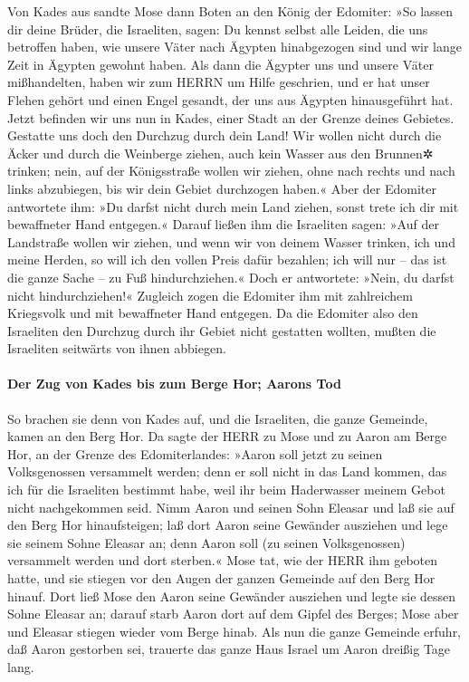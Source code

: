 Von Kades aus sandte Mose dann Boten an den König der
Edomiter: »So lassen dir deine Brüder, die Israeliten, sagen: Du kennst
selbst alle Leiden, die uns betroffen haben, wie unsere
Väter nach Ägypten hinabgezogen sind und wir lange Zeit in Ägypten
gewohnt haben. Als dann die Ägypter uns und unsere Väter mißhandelten,
haben wir zum HERRN um Hilfe geschrien, und er hat unser
Flehen gehört und einen Engel gesandt, der uns aus Ägypten hinausgeführt
hat. Jetzt befinden wir uns nun in Kades, einer Stadt an der Grenze
deines Gebietes. Gestatte uns doch den Durchzug durch
dein Land! Wir wollen nicht durch die Äcker und durch die Weinberge
ziehen, auch kein Wasser aus den Brunnen✲ trinken; nein, auf der
Königsstraße wollen wir ziehen, ohne nach rechts und nach links
abzubiegen, bis wir dein Gebiet durchzogen haben.« Aber
der Edomiter antwortete ihm: »Du darfst nicht durch mein Land ziehen,
sonst trete ich dir mit bewaffneter Hand entgegen.«
Darauf ließen ihm die Israeliten sagen: »Auf der
Landstraße wollen wir ziehen, und wenn wir von deinem Wasser trinken,
ich und meine Herden, so will ich den vollen Preis dafür bezahlen; ich
will nur -- das ist die ganze Sache -- zu Fuß hindurchziehen.«
Doch er antwortete: »Nein, du darfst nicht
hindurchziehen!« Zugleich zogen die Edomiter ihm mit zahlreichem
Kriegsvolk und mit bewaffneter Hand entgegen. Da die
Edomiter also den Israeliten den Durchzug durch ihr Gebiet nicht
gestatten wollten, mußten die Israeliten seitwärts von ihnen abbiegen.

\hypertarget{der-zug-von-kades-bis-zum-berge-hor-aarons-tod}{%
\paragraph{Der Zug von Kades bis zum Berge Hor; Aarons
Tod}\label{der-zug-von-kades-bis-zum-berge-hor-aarons-tod}}

So brachen sie denn von Kades auf, und die Israeliten,
die ganze Gemeinde, kamen an den Berg Hor. Da sagte der
HERR zu Mose und zu Aaron am Berge Hor, an der Grenze des
Edomiterlandes: »Aaron soll jetzt zu seinen Volksgenossen
versammelt werden; denn er soll nicht in das Land kommen, das ich für
die Israeliten bestimmt habe, weil ihr beim Haderwasser meinem Gebot
nicht nachgekommen seid. Nimm Aaron und seinen Sohn
Eleasar und laß sie auf den Berg Hor hinaufsteigen; laß
dort Aaron seine Gewänder ausziehen und lege sie seinem Sohne Eleasar
an; denn Aaron soll (zu seinen Volksgenossen) versammelt werden und dort
sterben.« Mose tat, wie der HERR ihm geboten hatte, und
sie stiegen vor den Augen der ganzen Gemeinde auf den Berg Hor hinauf.
Dort ließ Mose den Aaron seine Gewänder ausziehen und
legte sie dessen Sohne Eleasar an; darauf starb Aaron dort auf dem
Gipfel des Berges; Mose aber und Eleasar stiegen wieder vom Berge hinab.
Als nun die ganze Gemeinde erfuhr, daß Aaron gestorben
sei, trauerte das ganze Haus Israel um Aaron dreißig Tage lang.

